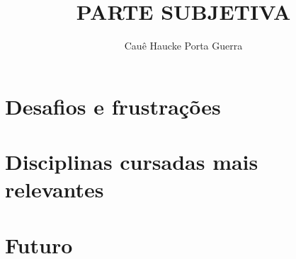 \documentclass[titlepage,a4paper]{article}
\title{PARTE SUBJETIVA}
\author{Cauê Haucke Porta Guerra}
\begin{document}
\maketitle

\tableofcontents
\newpage
\section{Desafios e frustrações}

\section{Disciplinas cursadas mais relevantes}

\section{Futuro}
\end{document}
